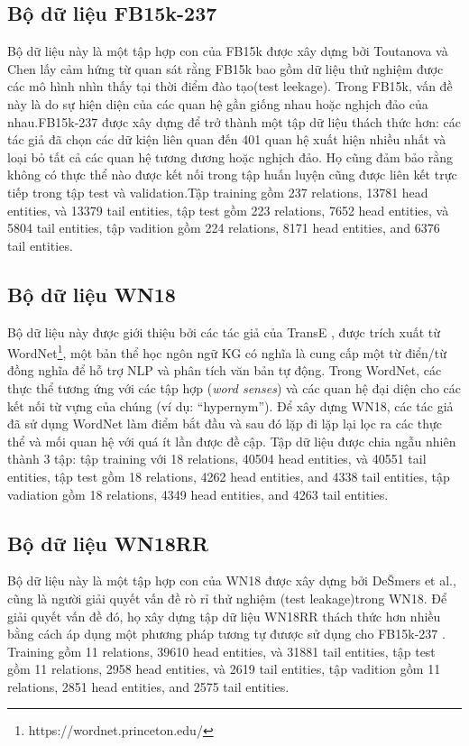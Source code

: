 \subsection{Bộ dữ liệu FB15k-237}
Bộ dữ liệu này là một tập hợp con của FB15k được xây dựng bởi Toutanova và Chen \cite{toutanova2015observed} lấy cảm hứng từ quan sát rằng FB15k bao gồm dữ liệu thử nghiệm được các mô hình nhìn thấy tại thời điểm đào tạo(test leekage). Trong FB15k, vấn đề này là do sự hiện diện của các quan hệ gần giống nhau hoặc nghịch đảo của nhau.FB15k-237 được xây dựng để trở thành một tập dữ liệu thách thức hơn: các tác giả đã chọn các dữ kiện liên quan đến 401 quan hệ xuất hiện nhiều nhất và loại bỏ tất cả các quan hệ tương đương hoặc nghịch đảo. Họ cũng đảm bảo rằng không có thực thể nào được kết nối trong tập huấn luyện cũng được liên kết trực tiếp trong tập test và validation.Tập training gồm 237 relations, 13781 head entities, và 13379 tail entities, tập test gồm 223 relations, 7652 head entities, và 5804 tail entities, tập vadition gồm 224 relations, 8171 head entities, and 6376 tail entities.

\subsection{Bộ dữ liệu WN18}
Bộ dữ liệu này được giới thiệu bởi các tác giả của TransE \cite{bordes2013translating}, được trích xuất từ WordNet\footnote{https://wordnet.princeton.edu/}, một bản thể học ngôn ngữ KG có nghĩa là cung cấp một từ điển/từ đồng nghĩa để hỗ trợ NLP và phân tích văn bản tự động. Trong WordNet, các thực thể tương ứng với các tập hợp (\textit{word senses}) và các quan hệ đại diện cho các kết nối từ vựng của chúng (ví dụ: “hypernym”). Để xây dựng WN18, các tác giả đã sử dụng WordNet làm điểm bắt đầu và sau đó lặp đi lặp lại lọc ra các thực thể và mối quan hệ với quá ít lần được đề cập. Tập dữ liệu được chia ngẫu nhiên thành 3 tập: tập training với 18 relations, 40504 head entities, và 40551 tail entities, tập test gồm 18 relations, 4262 head entities, and 4338 tail entities, tập vadiation gồm 18 relations, 4349 head entities, and 4263 tail entities.

\subsection{Bộ dữ liệu WN18RR}
Bộ dữ liệu này là một tập hợp con của WN18 được xây dựng bởi DeŠmers et al.\cite{dettmers2017convolutional}, cũng là người giải quyết vấn đề rò rỉ thử nghiệm (test leakage)trong WN18. Để giải quyết vấn đề đó, họ xây dựng tập dữ liệu WN18RR thách thức hơn nhiều bằng cách áp dụng một phương pháp tương tự đưược sử dụng cho FB15k-237 \cite{toutanova2015observed}. Training gồm 11 relations, 39610 head entities, và 31881 tail entities, tập test gồm 11 relations, 2958 head entities, và 2619 tail entities, tập vadition gồm 11 relations, 2851 head entities, and 2575 tail entities.

